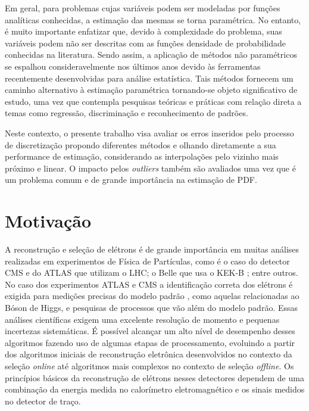 Em geral, para problemas cujas variáveis podem ser modeladas por funções analíticas conhecidas, a estimação das mesmas se torna paramétrica. No entanto, é muito importante enfatizar que, devido à complexidade do problema, suas variáveis podem não ser descritas com as funções densidade de probabilidade conhecidas na literatura. Sendo assim, a aplicação de métodos não paramétricos se espalhou consideravelmente nos últimos anos devido às ferramentas recentemente desenvolvidas para análise estatística. Tais métodos  fornecem um caminho alternativo à estimação paramétrica tornando-se objeto significativo de estudo, uma vez que contempla pesquisas teóricas e práticas com relação direta a temas como regressão, discriminação e reconhecimento de padrões. 


Neste contexto, o presente trabalho visa avaliar os erros inseridos pelo processo de discretização propondo diferentes métodos e olhando diretamente a sua performance de estimação, considerando as interpolações pelo vizinho mais próximo e linear. O impacto pelos \textit{outliers} também são avaliados uma vez que é um problema comum e de grande importância na estimação de \ac{PDF}.

\section{Motivação}


A reconstrução e seleção de elétrons é de grande importância em muitas análises realizadas em experimentos de Física de Partículas, como é o caso do detector \ac{CMS} e do \ac{ATLAS} que utilizam o \ac{LHC}; o Belle \cite{hanagaki2002electron} que usa o KEK-B \cite{superk}; entre outros. No caso dos experimentos ATLAS e CMS a identificação correta dos elétrons é exigida para medições precisas do modelo padrão \cite{modelopadrao}, como aquelas relacionadas ao Bóson de Higgs, e pesquisas de processos que vão além do modelo padrão. Essas análises científicas exigem uma excelente resolução de momento e pequenas incertezas sistemáticas. É possível alcançar um alto nível de desempenho desses algoritmos fazendo uso de algumas etapas de processamento, evoluindo a partir dos algoritmos iniciais de reconstrução eletrônica desenvolvidos no contexto da seleção \textit{online} até algoritmos mais complexos no contexto de seleção \textit{offline}. Os princípios básicos da reconstrução de elétrons nesses detectores dependem de uma combinação da energia medida no calorímetro eletromagnético e os sinais medidos no detector de traço.

